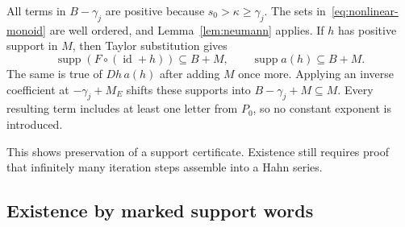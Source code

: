\documentclass[11pt,letterpaper]{article}
\theoremstyle{definition}
\theoremstyle{remark}
\newcommand{\supp}{\operatorname{supp}}
\newcommand{\id}{\operatorname{id}}
\numberwithin{equation}{section}
\begin{document}
All terms in $B-\gamma_j$ are positive because $s_0>\kappa\ge\gamma_j$.
The sets in~\eqref{eq:nonlinear-monoid} are well ordered, and
Lemma~\ref{lem:neumann} applies.  If $h$ has positive support in $M$, then
Taylor substitution gives
\[
 \supp(F\circ(\id+h))\subseteq B+M,
 \qquad \supp a(h)\subseteq B+M.
\]
The same is true of $Dh\,a(h)$ after adding $M$ once more.  Applying an
inverse coefficient at $-\gamma_j+M_E$ shifts these supports into
$B-\gamma_j+M\subseteq M$.  Every resulting term includes at least one
letter from $P_0$, so no constant exponent is introduced.

This shows preservation of a support certificate.  Existence still requires
proof that infinitely many iteration steps assemble into a Hahn series.

\subsection{Existence by marked support words}
\end{document}
